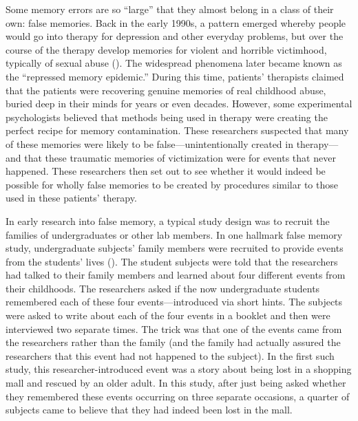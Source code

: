 \documentclass[
]{krantz}
\begin{document}
Some memory errors are so ``large'' that they almost belong in a class of their own: false memories. Back in the early 1990s, a pattern emerged whereby people would go into therapy for depression and other everyday problems, but over the course of the therapy develop memories for violent and horrible victimhood, typically of sexual abuse (). The widespread phenomena later became known as the ``repressed memory epidemic.'' During this time, patients' therapists claimed that the patients were recovering genuine memories of real childhood abuse, buried deep in their minds for years or even decades. However, some experimental psychologists believed that methods being used in therapy were creating the perfect recipe for memory contamination. These researchers suspected that many of these memories were likely to be false---unintentionally created in therapy---and that these traumatic memories of victimization were for events that never happened. These researchers then set out to see whether it would indeed be possible for wholly false memories to be created by procedures similar to those used in these patients' therapy.

In early research into false memory, a typical study design was to recruit the families of undergraduates or other lab members. In one hallmark false memory study, undergraduate subjects' family members were recruited to provide events from the students' lives (). The student subjects were told that the researchers had talked to their family members and learned about four different events from their childhoods. The researchers asked if the now undergraduate students remembered each of these four events---introduced via short hints. The subjects were asked to write about each of the four events in a booklet and then were interviewed two separate times. The trick was that one of the events came from the researchers rather than the family (and the family had actually assured the researchers that this event had not happened to the subject). In the first such study, this researcher-introduced event was a story about being lost in a shopping mall and rescued by an older adult. In this study, after just being asked whether they remembered these events occurring on three separate occasions, a quarter of subjects came to believe that they had indeed been lost in the mall.
\end{document}
